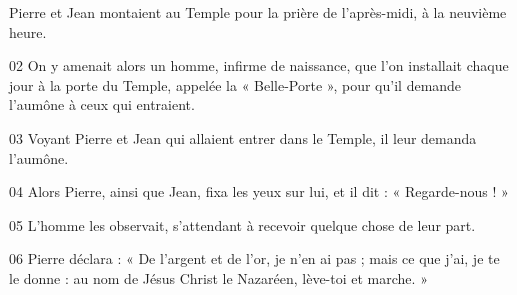 Pierre et Jean montaient au Temple pour la prière de l’après-midi, à la neuvième heure.

02 On y amenait alors un homme, infirme de naissance, que l’on installait chaque jour à la porte du Temple, appelée la « Belle-Porte », pour qu’il demande l’aumône à ceux qui entraient.

03 Voyant Pierre et Jean qui allaient entrer dans le Temple, il leur demanda l’aumône.

04 Alors Pierre, ainsi que Jean, fixa les yeux sur lui, et il dit : « Regarde-nous ! »

05 L’homme les observait, s’attendant à recevoir quelque chose de leur part.

06 Pierre déclara : « De l’argent et de l’or, je n’en ai pas ; mais ce que j’ai, je te le donne : au nom de Jésus Christ le Nazaréen, lève-toi et marche. »